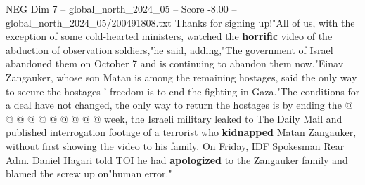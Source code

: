 \begin{textsample}{NEG Dim 7 – global\_north\_2024\_05 – Score -8.00 – global\_north\_2024\_05/200491808.txt}
Thanks for signing up!"All of us, with the exception of some cold-hearted ministers, watched the \textbf{horrific} video of the abduction of observation soldiers,"he said, adding,"The government of Israel abandoned them on October 7 and is continuing to abandon them now."Einav Zangauker, whose son Matan is among the remaining hostages, said the only way to secure the hostages ' freedom is to end the fighting in Gaza."The conditions for a deal have not changed, the only way to return the hostages is by ending the @ @ @ @ @ @ @ @ @ @ week, the Israeli military leaked to The Daily Mail and published interrogation footage of a terrorist who \textbf{kidnapped} Matan Zangauker, without first showing the video to his family.
On Friday, IDF Spokesman Rear Adm.
Daniel Hagari told TOI he had \textbf{apologized} to the Zangauker family and blamed the screw up on"human error."

\end{textsample}
